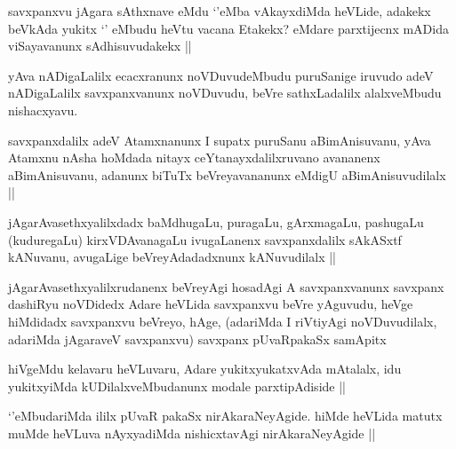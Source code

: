 
\begin{artha}
savxpanxvu jAgara sAthxnave eMdu `\stext'eMba vAkayxdiMda heVLide, adakekx beVkAda yukitx `\stext' eMbudu heVtu vacana Etakekx? eMdare parxtijecnx mADida viSayavanunx sAdhisuvudakekx ||
\end{artha}


\begin{artha}
yAva nADigaLalilx ecacxranunx noVDuvudeMbudu puruSanige iruvudo adeV nADigaLalilx savxpanxvanunx noVDuvudu, beVre sathxLadalilx alalxveMbudu nishacxyavu.
\end{artha}


\begin{artha}
savxpanxdalilx adeV Atamxnanunx I supatx puruSanu aBimAnisuvanu, yAva Atamxnu nAsha hoMdada nitayx ceYtanayxdalilxruvano avananenx aBimAnisuvanu, adanunx biTuTx beVreyavananunx eMdigU aBimAnisuvudilalx ||
\end{artha}


\begin{artha}
jAgarAvasethxyalilxdadx baMdhugaLu, puragaLu, gArxmagaLu, pashugaLu (kuduregaLu) kirxVDAvanagaLu ivugaLanenx savxpanxdalilx sAkASxtf kANuvanu, avugaLige beVreyAdadadxnunx kANuvudilalx ||
\end{artha}

\begin{artha}
jAgarAvasethxyalilxrudanenx beVreyAgi hosadAgi A savxpanxvanunx savxpanx dashiRyu noVDidedx Adare heVLida savxpanxvu beVre yAguvudu, heVge hiMdidadx savxpanxvu beVreyo, hAge, (adariMda I riVtiyAgi noVDuvudilalx, adariMda jAgaraveV savxpanxvu) savxpanx pUvaRpakaSx samApitx
\end{artha}

\begin{artha}
hiVgeMdu kelavaru heVLuvaru, Adare yukitxyukatxvAda mAtalalx, idu yukitxyiMda kUDilalxveMbudanunx modale parxtipAdiside ||
\end{artha}


\begin{artha}
`\stext'eMbudariMda ililx pUvaR pakaSx nirAkaraNeyAgide. hiMde heVLida matutx muMde heVLuva nAyxyadiMda nishicxtavAgi nirAkaraNeyAgide ||
\end{artha}
